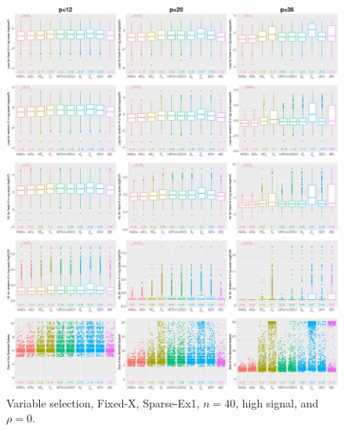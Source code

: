 \begin{figure}[!ht]
\centering
\includegraphics[width=\textwidth]{figures/supplement/fixedx/subset_selection/Sparse-Ex1_n40_hsnr_rho0.eps}
\caption{Variable selection, Fixed-X, Sparse-Ex1, $n=40$, high signal, and $\rho=0$.}
\end{figure}
\clearpage
